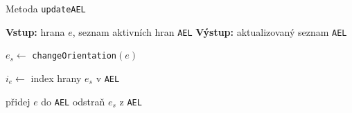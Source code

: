 \begin{algorithm}
    \caption{Metoda \texttt{updateAEL}}
    \begin{algorithmic}[1]
        \STATE \textbf{Vstup:} hrana $e$, seznam aktivních hran \texttt{AEL}
        \STATE \textbf{Výstup:} aktualizovaný seznam \texttt{AEL}

        \STATE $e_s \gets$ \texttt{changeOrientation}$(e)$ 

        \STATE $i_e \gets$ index hrany $e_s$ v \texttt{AEL} 

            \STATE přidej $e$ do \texttt{AEL} 
        \ELSE
            \STATE odstraň $e_s$ z \texttt{AEL} 
        \ENDIF
    \end{algorithmic}
\end{algorithm}
